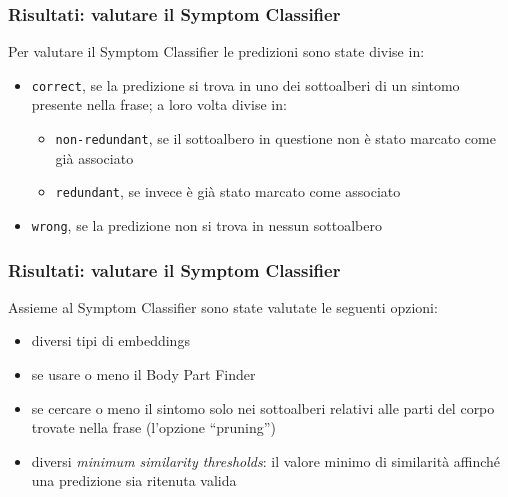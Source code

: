 \documentclass{beamer}
\begin{document}
\begin{frame}
\frametitle{Risultati: valutare il Symptom Classifier}
Per valutare il Symptom Classifier le predizioni sono state divise in:
\pause\begin{itemize}
  \item \texttt{correct}, se la predizione si trova in uno dei sottoalberi di un sintomo presente nella frase; a loro volta divise in:\pause
    \begin{itemize}
      \item \texttt{non-redundant}, se il sottoalbero in questione non è stato marcato come già associato\pause
      \item \texttt{redundant}, se invece è già stato marcato come  associato\pause
    \end{itemize}
  \item \texttt{wrong}, se la predizione non si trova in nessun sottoalbero
\end{itemize}
\end{frame}

\begin{frame}
\frametitle{Risultati: valutare il Symptom Classifier}
Assieme al Symptom Classifier sono state valutate le seguenti opzioni:\pause
\begin{itemize}
  \item diversi tipi di embeddings \pause
  \item se usare o meno il Body Part Finder \pause
  \item se cercare o meno il sintomo solo nei sottoalberi relativi alle parti del corpo trovate nella frase (l'opzione ``pruning'') \pause
  \item diversi \emph{minimum similarity thresholds}: il valore minimo di similarità affinché una predizione sia ritenuta valida
\end{itemize}
\end{frame}
\end{document}
